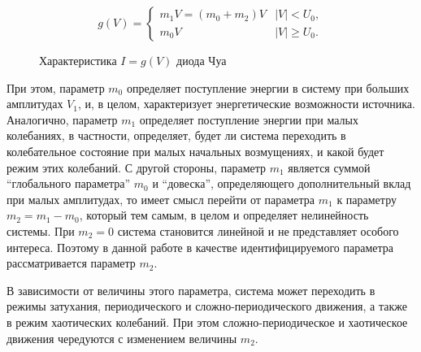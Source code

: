 \documentclass[a4paper,12pt]{article}
\begin{document}
\begin{equation}
g(V) =
\begin{cases}
  m_1 V = ( m_0 + m_2 ) V & |V| <   U_0, \\
  m_0 V                   & |V| \ge U_0.
\end{cases}
\label{atu:eq:diodchua}
\end{equation}

\begin{figure}[htb!]
\begin{center}
\end{center}
\caption{Характеристика \(I=g(V)\) диода Чуа}
\label{atu:fig:diodchua}
\end{figure}


При этом, параметр \(m_0\) определяет поступление энергии в систему
при больших амплитудах \(V_1\), и, в целом, характеризует
энергетические возможности источника.
Аналогично, параметр \(m_1\) определяет поступление энергии
при малых колебаниях, в частности, определяет, будет ли
система переходить в колебательное состояние при малых начальных
возмущениях, и какой будет режим этих колебаний.
С другой стороны, параметр \(m_1\) является суммой
``глобального параметра'' \(m_0\) и ``довеска'',
определяющего дополнительный вклад при малых амплитудах,
то имеет смысл перейти от параметра \(m_1\) к параметру
\( m_2 = m_1 - m_0 \), который тем самым, в целом
и определяет нелинейность
системы. При \( m_2 = 0 \) система становится линейной
и не представляет особого интереса. Поэтому
в данной работе в качестве
идентифицируемого параметра рассматривается параметр \(m_2\).

В зависимости от величины этого параметра,
система может переходить в режимы затухания,
периодического и сложно-периодического движения, а также в режим
хаотических колебаний. При этом сложно-периодическое и хаотическое
движения чередуются с изменением величины \(m_2\).
\end{document}
